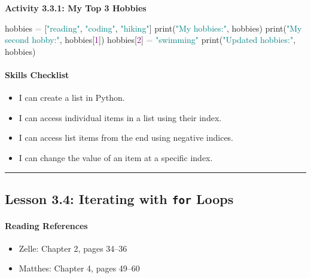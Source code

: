 \documentclass[
  justified,
  openright,
]{tufte-book}
\let\subsubsection\paragraph
\let\paragraph\paragraph
\newcommand{\BuiltInTok}[1]{#1}
\newcommand{\DecValTok}[1]{\textcolor{Purple}{#1}}
\newcommand{\NormalTok}[1]{#1}
\newcommand{\OperatorTok}[1]{\textcolor{DarkGray}{#1}}
\newcommand{\StringTok}[1]{\textcolor{Teal}{#1}}
\newenvironment{Shaded}{%
  \begin{snugshade}
}{%
  \end{snugshade}
}
\let\subsubsection\paragraph
\let\paragraph\paragraph
\providecommand{\tightlist}{%
  \setlength{\itemsep}{0pt}\setlength{\parskip}{0pt}}
\begin{document}
\textbf{Activity 3.3.1: My Top 3 Hobbies}

\begin{Shaded}
\begin{Highlighting}[]
\NormalTok{hobbies }\OperatorTok{=}\NormalTok{ [}\StringTok{"reading"}\NormalTok{, }\StringTok{"coding"}\NormalTok{, }\StringTok{"hiking"}\NormalTok{]}
\BuiltInTok{print}\NormalTok{(}\StringTok{"My hobbies:"}\NormalTok{, hobbies)}
\BuiltInTok{print}\NormalTok{(}\StringTok{"My second hobby:"}\NormalTok{, hobbies[}\DecValTok{1}\NormalTok{])}
\NormalTok{hobbies[}\DecValTok{2}\NormalTok{] }\OperatorTok{=} \StringTok{"swimming"}
\BuiltInTok{print}\NormalTok{(}\StringTok{"Updated hobbies:"}\NormalTok{, hobbies)}
\end{Highlighting}
\end{Shaded}

\subsubsection{Skills Checklist}\label{skills-checklist-14}

\begin{itemize}
\tightlist
\item[$\square$]
  I can create a list in Python.
\item[$\square$]
  I can access individual items in a list using their index.
\item[$\square$]
  I can access list items from the end using negative indices.
\item[$\square$]
  I can change the value of an item at a specific index.
\end{itemize}

\begin{center}\rule{0.5\linewidth}{0.5pt}\end{center}

\subsection{\texorpdfstring{Lesson 3.4: Iterating with \texttt{for}
Loops}{Lesson 3.4: Iterating with for Loops}}\label{lesson-3.4-iterating-with-for-loops}

\subsubsection{Reading References}\label{reading-references-15}

\begin{itemize}
\tightlist
\item
  Zelle: Chapter 2, pages 34--36
\item
  Matthes: Chapter 4, pages 49--60
\end{itemize}
\end{document}
